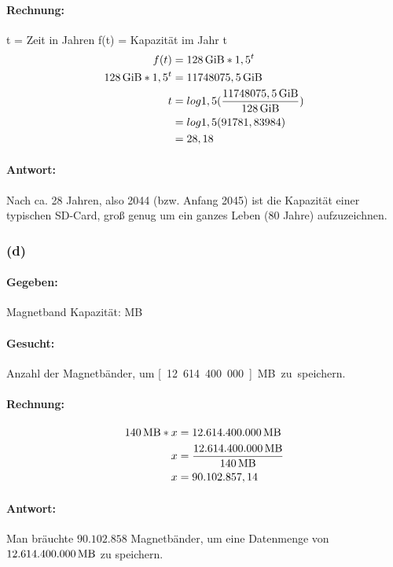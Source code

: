 \documentclass[11pt,a4paper]{article}
\begin{document}
\paragraph{Rechnung:}
    t = Zeit in Jahren
    f(t) = Kapazität im Jahr t
\begin{align}
    f(t) &= \unit[128]{GiB}*1,5^{t}\\
    \unit[128]{GiB}*1,5^{t} &= \unit[11748075,5]{GiB}\\
    t &= log1,5(\frac{\unit[11748075,5]{GiB}}{\unit[128]{GiB}})\\
      &= log1,5(91781,83984)\\
       &= 28,18\\
\end{align}

\paragraph{Antwort:}
    Nach ca. 28 Jahren, also 2044 (bzw. Anfang 2045) ist die Kapazität einer typischen SD-Card, groß genug um ein ganzes Leben (80 Jahre) aufzuzeichnen.


\subsubsection{(d)} %

\paragraph{Gegeben:}
    Magnetband Kapazität: \unit[140]{MB}

\paragraph{Gesucht:}
    Anzahl der Magnetbänder, um \unit[12.614.400.000]{MB} zu speichern.

\paragraph{Rechnung:}
\begin{align}
    \unit[140]{MB}*x &= \unit[12.614.400.000]{MB}\\
    x &= \frac{\unit[12.614.400.000]{MB}}{\unit[140]{MB}}\\
    x &= 90.102.857,14
\end{align}

\paragraph{Antwort:}
    Man bräuchte $90.102.858$ Magnetbänder, um eine Datenmenge von $\unit[12.614.400.000]{MB}$ zu speichern.


\newpage



\end{document}
